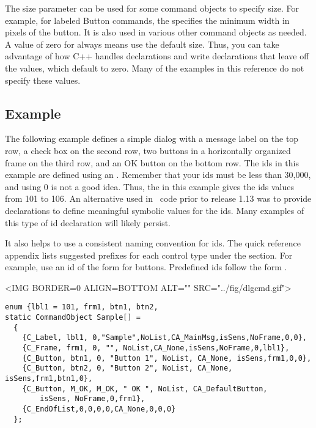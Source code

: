 
The size parameter can be used for some command objects to
specify size. For example, for labeled Button commands,
the  specifies the minimum width in pixels of the
button. It is also used in various other command objects as
needed. A value of zero for  always means use the
default size. Thus, you can take advantage of how C++ handles
declarations and write  declarations that
leave off the  values, which
default to zero. Many of the examples in this reference do not
specify these values.

\subsection* {Example}

The following example defines a simple dialog with a message
label on the top row, a check box on the second row, two buttons
in a horizontally organized frame on the third row, and an OK
button on the bottom row. The ids in this example are
defined using an . Remember that your ids must be
less than 30,000, and using 0 is not a good idea.
Thus, the  in this example gives the ids
values from 101 to 106.
An alternative used in \V\ code prior to release 1.13 was
to provide 
declarations to define meaningful symbolic values for the ids.
Many examples of this type of id declaration will likely
persist.

It also helps to use a consistent naming convention for ids.
The quick reference appendix lists suggested prefixes for
each control type under the  section. For
example, use an id of the form  for buttons.
Predefined ids follow the form .

\vspace{.1in}

\small
\begin{rawhtml}
<IMG BORDER=0 ALIGN=BOTTOM ALT="" SRC="../fig/dlgcmd.gif">
\end{rawhtml}

\begin{latexonly}

\end{latexonly}
\normalfont\normalsize

\footnotesize
\begin{verbatim}
enum {lbl1 = 101, frm1, btn1, btn2,
static CommandObject Sample[] =
  {
    {C_Label, lbl1, 0,"Sample",NoList,CA_MainMsg,isSens,NoFrame,0,0},
    {C_Frame, frm1, 0, "", NoList,CA_None,isSens,NoFrame,0,lbl1},
    {C_Button, btn1, 0, "Button 1", NoList, CA_None, isSens,frm1,0,0},
    {C_Button, btn2, 0, "Button 2", NoList, CA_None, isSens,frm1,btn1,0},
    {C_Button, M_OK, M_OK, " OK ", NoList, CA_DefaultButton, 
        isSens, NoFrame,0,frm1},
    {C_EndOfList,0,0,0,0,CA_None,0,0,0}
  };
\end{verbatim}
\normalfont\normalsize

